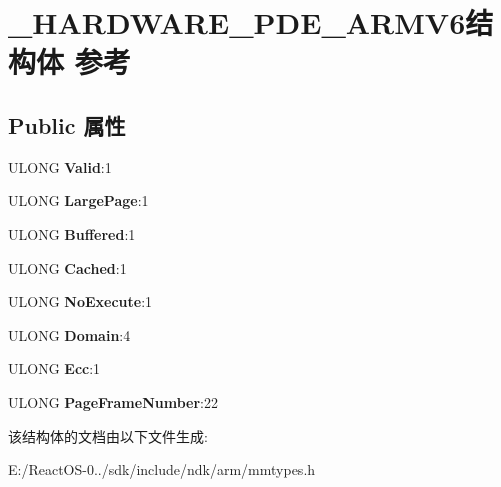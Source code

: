 \hypertarget{struct___h_a_r_d_w_a_r_e___p_d_e___a_r_m_v6}{}\section{\+\_\+\+H\+A\+R\+D\+W\+A\+R\+E\+\_\+\+P\+D\+E\+\_\+\+A\+R\+M\+V6结构体 参考}
\label{struct___h_a_r_d_w_a_r_e___p_d_e___a_r_m_v6}
\subsection*{Public 属性}
\begin{DoxyCompactItemize}
\item 
\mbox{\label{struct___h_a_r_d_w_a_r_e___p_d_e___a_r_m_v6_a126c42e1615b603d3b27e3fd09623234}} 
U\+L\+O\+NG {\bfseries Valid}\+:1
\item 
\mbox{\label{struct___h_a_r_d_w_a_r_e___p_d_e___a_r_m_v6_a488d8f4e6b85cbe802a72d22dd158ac4}} 
U\+L\+O\+NG {\bfseries Large\+Page}\+:1
\item 
\mbox{\label{struct___h_a_r_d_w_a_r_e___p_d_e___a_r_m_v6_a4018c0bf13f8c6116cda26e35893b04e}} 
U\+L\+O\+NG {\bfseries Buffered}\+:1
\item 
\mbox{\label{struct___h_a_r_d_w_a_r_e___p_d_e___a_r_m_v6_ae0ff061efe2efbb821744d60a9122ca1}} 
U\+L\+O\+NG {\bfseries Cached}\+:1
\item 
\mbox{\label{struct___h_a_r_d_w_a_r_e___p_d_e___a_r_m_v6_a8c9f76004ad1cb838cc7b2863f82607a}} 
U\+L\+O\+NG {\bfseries No\+Execute}\+:1
\item 
\mbox{\label{struct___h_a_r_d_w_a_r_e___p_d_e___a_r_m_v6_abbc6d83611873c1b716c7c0c00a3573c}} 
U\+L\+O\+NG {\bfseries Domain}\+:4
\item 
\mbox{\label{struct___h_a_r_d_w_a_r_e___p_d_e___a_r_m_v6_a62ba902f9bb96e24d7a6cdec5c23ebec}} 
U\+L\+O\+NG {\bfseries Ecc}\+:1
\item 
\mbox{\label{struct___h_a_r_d_w_a_r_e___p_d_e___a_r_m_v6_a8ad33287891c3057b347b8a7b574e50f}} 
U\+L\+O\+NG {\bfseries Page\+Frame\+Number}\+:22
\end{DoxyCompactItemize}


该结构体的文档由以下文件生成\+:\begin{DoxyCompactItemize}
\item 
E\+:/\+React\+O\+S-\/0../sdk/include/ndk/arm/mmtypes.\+h\end{DoxyCompactItemize}
